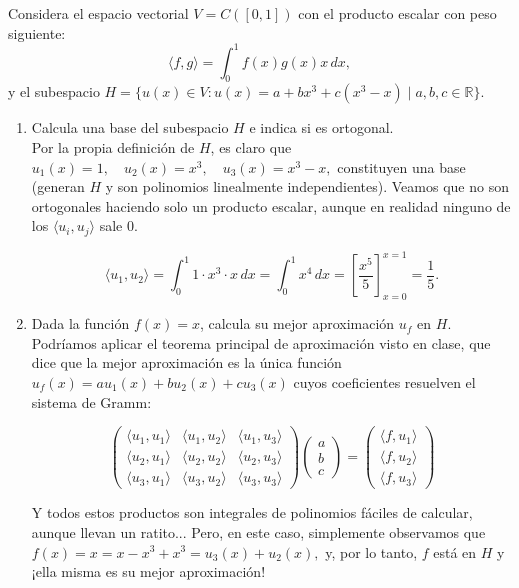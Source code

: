 \documentclass[12pt]{article}
\begin{document}
	\begin{ejercicio}
		Considera el espacio vectorial $V = C([0,1])$ con el producto escalar con peso siguiente:
		$$ \langle f, g \rangle = \int_0^1 f(x) g(x) x \, dx,$$
		y el subespacio $ H = \{ u(x) \in V : u(x) = a + b x^3 + c(x^3 - x) \mid a, b, c \in \mathbb{R} \}.$
		\begin{enumerate}[label=\alph*)]
			\item Calcula una base del subespacio $H$ e indica si es ortogonal. \\
			
				Por la propia definición de $H$, es claro que $u_1(x) = 1, \quad u_2(x) = x^3, \quad u_3(x) = x^3 - x,$ 
				constituyen una base (generan $H$ y son polinomios linealmente independientes). Veamos que no son ortogonales haciendo solo un producto escalar, aunque en realidad ninguno de los $\langle u_i, u_j \rangle$ sale $0$.
				
				$$ \langle u_1, u_2 \rangle = \int_0^1 1 \cdot x^3 \cdot x \, dx 
				= \int_0^1 x^4 \, dx 
				= \left[ \frac{x^5}{5} \right]_{x=0}^{x=1}
				= \frac{1}{5}.$$
				
			\item Dada la función $f(x) = x$, calcula su mejor aproximación $u_f$ en $H$. \\
			
				Podríamos aplicar el teorema principal de aproximación visto en clase, que dice que la mejor aproximación es la única función $u_f(x) = a u_1(x) + b u_2(x) + c u_3(x)$ cuyos coeficientes resuelven el sistema de Gramm:
				
				$$\begin{pmatrix}
					\langle u_1, u_1 \rangle & \langle u_1, u_2 \rangle & \langle u_1, u_3 \rangle \\
					\langle u_2, u_1 \rangle & \langle u_2, u_2 \rangle & \langle u_2, u_3 \rangle \\
					\langle u_3, u_1 \rangle & \langle u_3, u_2 \rangle & \langle u_3, u_3 \rangle
				\end{pmatrix}
				\begin{pmatrix}
					a \\ 
					b \\ 
					c
				\end{pmatrix}
				=
				\begin{pmatrix}
					\langle f, u_1 \rangle \\
					\langle f, u_2 \rangle \\
					\langle f, u_3 \rangle
				\end{pmatrix}$$
				
				Y todos estos productos son integrales de polinomios fáciles de calcular, aunque llevan un ratito... Pero, en este caso, simplemente observamos que $f(x) = x = x - x^3 + x^3 = u_3(x) + u_2(x),$ y, por lo tanto, $f$ está en $H$ y ¡ella misma es su mejor aproximación!
		\end{enumerate}
	\end{ejercicio}
	
\end{document}
